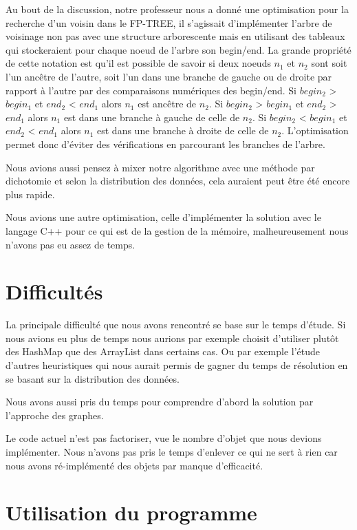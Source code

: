 \documentclass[12pt]{report}
\begin{document}
Au bout de la discussion, notre professeur nous a donné une optimisation pour la recherche d'un voisin dans le FP-TREE, il s'agissait d'implémenter l'arbre de voisinage non pas avec une structure arborescente mais en utilisant des tableaux qui stockeraient pour chaque noeud de l'arbre son begin/end. La grande propriété de cette notation est qu'il est possible de savoir si deux noeuds $n_{1}$ et $n_{2}$ sont soit l'un ancêtre de l'autre, soit l'un dans une branche de gauche ou de droite par rapport à l'autre par des comparaisons numériques des begin/end. Si $begin_{2}$ > $begin_{1}$ et $end_{2}$ < $end_{1}$ alors $n_{1}$ est ancêtre de $n_{2}$.
Si $begin_{2}$ > $begin_{1}$ et $end_{2}$ > $end_{1}$ alors $n_{1}$ est dans une branche à gauche de celle de $n_{2}$. Si $begin_{2}$ < $begin_{1}$ et $end_{2}$ < $end_{1}$ alors $n_{1}$ est dans une branche à droite de celle de $n_{2}$. L'optimisation permet donc d'éviter des vérifications en parcourant les branches de l'arbre.

Nous avions aussi pensez à mixer notre algorithme avec une méthode par dichotomie et selon la distribution des données, cela auraient peut être été encore plus rapide.

Nous avions une autre optimisation, celle d'implémenter la solution avec le langage C++ pour ce qui est de la gestion de la mémoire, malheureusement nous n'avons pas eu assez de temps.

\section{Difficultés}

La principale difficulté que nous avons rencontré se base sur le temps d'étude. Si nous avions eu plus de temps nous aurions par exemple choisit d'utiliser plutôt des HashMap que des ArrayList dans certains cas. Ou par exemple l'étude d'autres heuristiques qui nous aurait permis de gagner du temps de résolution en se basant sur la distribution des données. 

Nous avons aussi pris du temps pour comprendre d'abord la solution par l'approche des graphes.

Le code actuel n'est pas factoriser, vue le nombre d'objet que nous devions implémenter. Nous n'avons pas pris le temps d'enlever ce qui ne sert à rien car nous avons ré-implémenté des objets par manque d'efficacité.


\section{Utilisation du programme}
\end{document}
